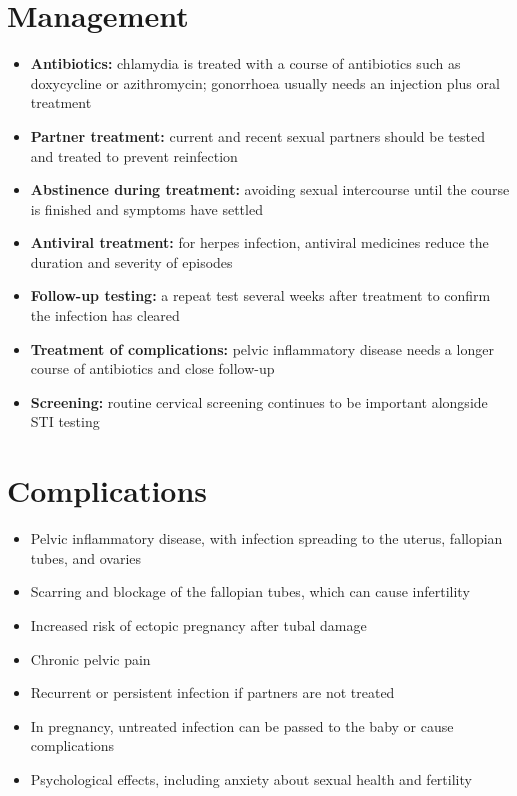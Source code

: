 \section*{Management}
\begin{itemize}
    \item \textbf{Antibiotics:} chlamydia is treated with a course of antibiotics such as doxycycline or azithromycin; gonorrhoea usually needs an injection plus oral treatment
    \item \textbf{Partner treatment:} current and recent sexual partners should be tested and treated to prevent reinfection
    \item \textbf{Abstinence during treatment:} avoiding sexual intercourse until the course is finished and symptoms have settled
    \item \textbf{Antiviral treatment:} for herpes infection, antiviral medicines reduce the duration and severity of episodes
    \item \textbf{Follow-up testing:} a repeat test several weeks after treatment to confirm the infection has cleared
    \item \textbf{Treatment of complications:} pelvic inflammatory disease needs a longer course of antibiotics and close follow-up
    \item \textbf{Screening:} routine cervical screening continues to be important alongside STI testing
\end{itemize}

\section*{Complications}
\begin{itemize}
    \item Pelvic inflammatory disease, with infection spreading to the uterus, fallopian tubes, and ovaries
    \item Scarring and blockage of the fallopian tubes, which can cause infertility
    \item Increased risk of ectopic pregnancy after tubal damage
    \item Chronic pelvic pain
    \item Recurrent or persistent infection if partners are not treated
    \item In pregnancy, untreated infection can be passed to the baby or cause complications
    \item Psychological effects, including anxiety about sexual health and fertility
\end{itemize}


